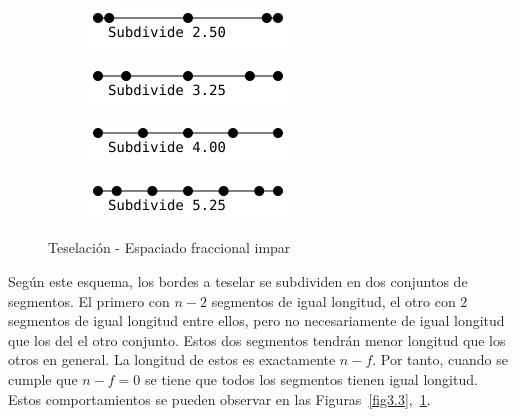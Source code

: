 \begin{figure}
	\centering
	\begin{subfigure}{.45\textwidth}
			\includegraphics[width=\textwidth]{figures/odd1.png}	
	\end{subfigure}
	\hfill
	\begin{subfigure}{.45\textwidth}
			\includegraphics[width=\textwidth]{figures/odd2.png}	
	\end{subfigure}
	\newline
	\begin{subfigure}{.45\textwidth}
			\includegraphics[width=\textwidth]{figures/odd3.png}	
	\end{subfigure}
	\hfill
	\begin{subfigure}{.45\textwidth}
			\includegraphics[width=\textwidth]{figures/odd4.png}	
	\end{subfigure}
	\caption{Teselación - Espaciado fraccional impar}
	\label{fig3.4}
\end{figure}

Según este esquema, los bordes a teselar se subdividen en dos conjuntos de
segmentos. El primero con $n-2$ segmentos de igual longitud, el otro con $2$
segmentos de igual longitud entre ellos, pero no necesariamente de igual
longitud que los del el otro conjunto. Estos dos segmentos tendrán menor
longitud que los otros en general. La longitud de estos es exactamente $n-f$.
Por tanto, cuando se cumple que $n-f=0$ se tiene que todos los segmentos tienen
igual longitud. Estos comportamientos se pueden observar en las
Figuras~\ref{fig3.3},~\ref{fig3.4}.

